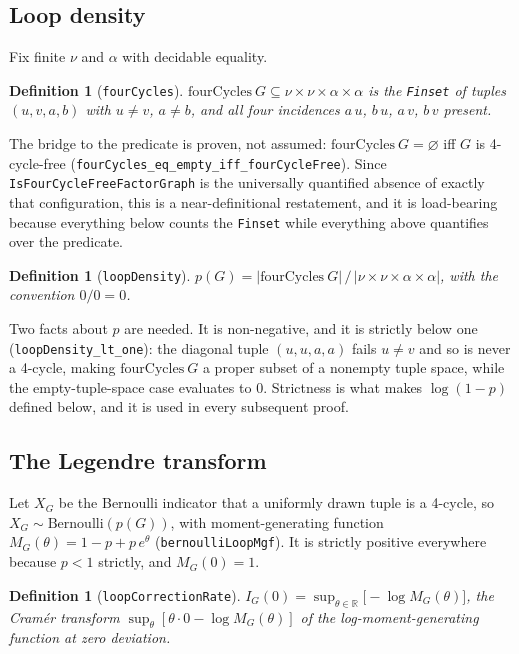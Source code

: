 \documentclass[aps,prx,reprint,nofootinbib,floatfix]{revtex4-2}
\newtheorem{defn}[thm]{Definition}
\begin{document}
\subsection{Loop density}

Fix finite $\nu$ and $\alpha$ with decidable equality.

\begin{defn}[\texttt{fourCycles}]
$\mathrm{fourCycles}\ G \subseteq \nu \times \nu \times \alpha \times \alpha$
is the \texttt{Finset} of tuples $(u,v,a,b)$ with $u \neq v$, $a \neq b$, and
all four incidences $a\,u$, $b\,u$, $a\,v$, $b\,v$ present.
\end{defn}

The bridge to the predicate is proven, not assumed:
$\mathrm{fourCycles}\ G = \varnothing$ iff $G$ is 4-cycle-free
(\texttt{fourCycles\_eq\_empty\_iff\_fourCycleFree}). Since
\texttt{IsFourCycleFreeFactorGraph} is the universally quantified absence of
exactly that configuration, this is a near-definitional restatement, and it is
load-bearing because everything below counts the \texttt{Finset} while
everything above quantifies over the predicate.

\begin{defn}[\texttt{loopDensity}]
\label{def:density}
$p(G) = |\mathrm{fourCycles}\ G| \,/\, |\nu \times \nu \times \alpha \times \alpha|$,
with the convention $0/0 = 0$.
\end{defn}

Two facts about $p$ are needed. It is non-negative, and it is strictly below
one (\texttt{loopDensity\_lt\_one}): the diagonal tuple $(u,u,a,a)$ fails
$u \neq v$ and so is never a 4-cycle, making $\mathrm{fourCycles}\ G$ a proper
subset of a nonempty tuple space, while the empty-tuple-space case evaluates to
$0$. Strictness is what makes $\log(1-p)$ defined below, and it is used in
every subsequent proof.

\subsection{The Legendre transform}

Let $X_G$ be the Bernoulli indicator that a uniformly drawn tuple is a 4-cycle,
so $X_G \sim \mathrm{Bernoulli}(p(G))$, with moment-generating function
$M_G(\theta) = 1 - p + p\,e^{\theta}$ (\texttt{bernoulliLoopMgf}). It is
strictly positive everywhere because $p < 1$ strictly, and $M_G(0) = 1$.

\begin{defn}[\texttt{loopCorrectionRate}]
$I_G(0) = \sup_{\theta \in \mathbb{R}} \bigl[ -\log M_G(\theta) \bigr]$,
the Cram\'er transform $\sup_\theta [\theta \cdot 0 - \log M_G(\theta)]$ of the
log-moment-generating function at zero deviation.
\end{defn}
\end{document}
